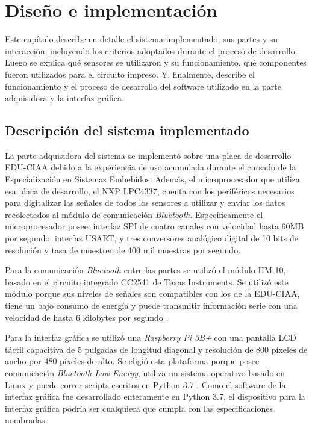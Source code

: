 \chapter{Diseño e implementación} %

\label{Chapter3}

Este capítulo describe en detalle el sistema implementado, sus partes y su interacción, incluyendo los criterios adoptados durante el proceso de desarrollo. Luego se explica qué sensores se utilizaron y su funcionamiento, qué componentes fueron utilizados para el circuito impreso. Y, finalmente, describe el funcionamiento y el proceso de desarrollo del software utilizado en la parte adquisidora y la interfaz gráfica.

\section{Descripción del sistema implementado}

La parte adquisidora del sistema se implementó sobre una placa de desarrollo EDU-CIAA debido a la experiencia de uso acumulada durante el cursado de la Especialización en Sistemas Embebidos. Además, el microprocesador que utiliza esa placa de desarrollo, el NXP LPC4337, cuenta con los periféricos necesarios para digitalizar las señales de todos los sensores a utilizar y enviar los datos recolectados al módulo de comunicación \textit{Bluetooth}. Específicamente el microprocesador posee: interfaz SPI de cuatro canales con velocidad hasta 60MB por segundo; interfaz USART, y tres conversores analógico digital de 10 bits de resolución y tasa de muestreo de 400 mil muestras por segundo.

Para la comunicación \textit{Bluetooth} entre las partes se utilizó el módulo HM-10, basado en el circuito integrado CC2541 de Texas Instruments. Se utilizó este módulo porque sus niveles de señales son compatibles con los de la EDU-CIAA, tiene un bajo consumo de energía y puede transmitir información serie con una velocidad de hasta 6 kilobytes por segundo \cite{HM-10}.

Para la interfaz gráfica se utilizó una \textit{Raspberry Pi 3B+} con una pantalla LCD táctil capacitiva de 5 pulgadas de longitud diagonal y resolución de 800 píxeles de ancho por 480 píxeles de alto. Se eligió esta plataforma porque posee comunicación \textit{Bluetooth Low-Energy}, utiliza un sistema operativo basado en Linux y puede correr scripts escritos en Python 3.7 \cite{raspberrypi}. Como el software de la interfaz gráfica fue desarrollado enteramente en Python 3.7, el dispositivo para la interfaz gráfica podría ser cualquiera que cumpla con las especificaciones nombradas.

